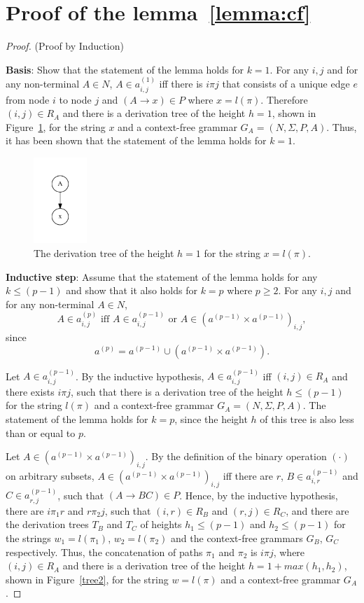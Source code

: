 \section{Proof of the lemma~\ref{lemma:cf}}\label{proof_lemma}

\begin{proof}(Proof by Induction)
	
	\textbf{Basis}: Show that the statement of the lemma holds for $k = 1$. For any $i, j$ and for any non-terminal $A \in N$, $A \in a^{(1)}_{i,j}$ iff there is $i \pi j$ that consists of a unique edge $e$ from node $i$ to node $j$ and $(A \rightarrow x) \in P$ where $x = l(\pi)$. Therefore $(i,j) \in R_A$ and there is a derivation tree of the height $h = 1$, shown in Figure~\ref{tree1}, for the string $x$ and a context-free grammar $G_A = (N,\Sigma,P,A)$. Thus, it has been shown that the statement of the lemma holds for $k = 1$.
	
	\begin{figure}[h!]
		\centering
		\includegraphics[width=2cm]{pictures/tree1.pdf}
		\caption{The derivation tree of the height $h = 1$ for the string $x = l(\pi)$.}
		\label{tree1}
	\end{figure}
	
	\textbf{Inductive step}: Assume that the statement of the lemma holds for any $k \leq (p - 1)$ and show that it also holds for $k = p$ where $p \geq 2$. For any $i, j$ and for any non-terminal $A \in N$, $$A \in a^{(p)}_{i,j} \text{ iff } A \in a^{(p-1)}_{i,j} \text{ or } A \in (a^{(p-1)} \times a^{(p-1)})_{i,j},$$ since $$a^{(p)} = a^{(p-1)} \cup (a^{(p-1)} \times a^{(p-1)}).$$
	
	Let $A \in a^{(p-1)}_{i,j}$. By the inductive hypothesis, $A \in a^{(p-1)}_{i,j}$ iff $(i,j) \in R_A$ and there exists $i \pi j$, such that there is a derivation tree of the height $h \leq (p-1)$ for the string $l(\pi)$ and a context-free grammar $G_A = (N,\Sigma,P,A)$. The statement of the lemma holds for $k = p$, since the height $h$ of this tree is also less than or equal to $p$.
	
	Let $A \in (a^{(p-1)} \times a^{(p-1)})_{i,j}$. By the definition of the binary operation $(\cdot)$ on arbitrary subsets, $A \in (a^{(p-1)} \times a^{(p-1)})_{i,j}$ iff there are $r$, $B \in a^{(p-1)}_{i,r}$ and $C \in a^{(p-1)}_{r,j}$, such that $(A \rightarrow B C) \in P$. Hence, by the inductive hypothesis, there are $i \pi_1 r$ and $r \pi_2 j$, such that $(i,r) \in R_B$ and $(r,j) \in R_C$, and there are the derivation trees $T_B$ and $T_C$ of heights $h_1 \leq (p-1)$ and $h_2 \leq (p-1)$ for the strings $w_1 = l(\pi_1)$, $w_2 = l(\pi_2)$ and the context-free grammars $G_B$, $G_C$ respectively. Thus, the concatenation of paths $\pi_1$ and $\pi_2$ is $i \pi j$, where $(i,j) \in R_A$ and there is a derivation tree of the height $h = 1 + max(h_1, h_2)$, shown in Figure~\ref{tree2}, for the string $w = l(\pi)$ and a context-free grammar $G_A$.
	

\end{proof}
